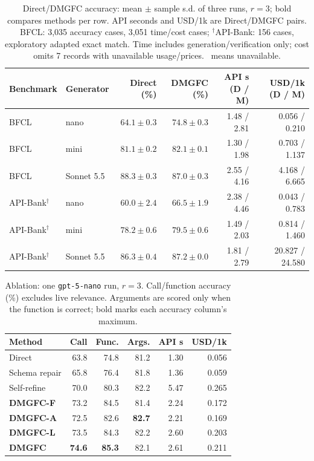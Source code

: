 \begin{table}[t]
\centering\footnotesize
\setlength{\tabcolsep}{5pt}
\begin{tabular}{@{}llrrrr@{}}
\toprule
Benchmark & Generator & Direct (\%) & \textbf{DMGFC} (\%) & API s (D / M) & USD/1k (D / M)\\
\midrule
BFCL & nano & $64.1\pm0.3$ & $\mathbf{74.8}\pm0.3$ & 1.48 / 2.81 & 0.056 / 0.210\\
BFCL & mini & $81.1\pm0.2$ & $\mathbf{82.1}\pm0.1$ & 1.30 / 1.98 & 0.703 / 1.137\\
BFCL & Sonnet 5.5 & $\mathbf{88.3}\pm0.3$ & $87.0\pm0.3$ & 2.55 / 4.16 & 4.168 / 6.665\\
\midrule
API-Bank$^{\dagger}$ & nano & $60.0\pm2.4$ & $\mathbf{66.5}\pm1.9$ & 2.38 / 4.46 & 0.043 / 0.783\\
API-Bank$^{\dagger}$ & mini & $78.2\pm0.6$ & $\mathbf{79.5}\pm0.6$ & 1.49 / 2.03 & 0.814 / 1.460\\
API-Bank$^{\dagger}$ & Sonnet 5.5 & $86.3\pm0.4$ & $\mathbf{87.2}\pm0.0$ & 1.81 / 2.79 & 20.827 / 24.580\\
\bottomrule
\end{tabular}
\caption{Direct/DMGFC accuracy: mean $\pm$ sample s.d. of three runs, $r=3$; bold compares methods per row. API seconds and USD/1k are Direct/DMGFC pairs. BFCL: 3,035 accuracy cases, 3,051 time/cost cases; $^{\dagger}$API-Bank: 156 cases, exploratory adapted exact match. Time includes generation/verification only; cost omits 7 records with unavailable usage/prices. \textemdash\ means unavailable.}
\label{tab:categories}
\end{table}

\begin{table}[t]
\centering\footnotesize
\setlength{\tabcolsep}{3pt}
\begin{tabular}{lrrrrr}
\toprule
Method & Call & Func. & Args. & API s & USD/1k\\
\midrule
Direct & 63.8 & 74.8 & 81.2 & 1.30 & 0.056 \\
Schema repair & 65.8 & 76.4 & 81.8 & 1.36 & 0.059 \\
Self-refine & 70.0 & 80.3 & 82.2 & 5.47 & 0.265 \\
\textbf{DMGFC-F} & 73.2 & 84.5 & 81.4 & 2.24 & 0.172 \\
\textbf{DMGFC-A} & 72.5 & 82.6 & \textbf{82.7} & 2.21 & 0.169 \\
\textbf{DMGFC-L} & 73.5 & 84.3 & 82.2 & 2.60 & 0.203 \\
\textbf{DMGFC} & \textbf{74.6} & \textbf{85.3} & 82.1 & 2.61 & 0.211 \\
\bottomrule
\end{tabular}
\caption{Ablation: one \texttt{gpt-5-nano} run, $r=3$. Call/function accuracy (\%) excludes live relevance. Arguments are scored only when the function is correct; bold marks each accuracy column's maximum.}
\label{tab:main}
\end{table}

